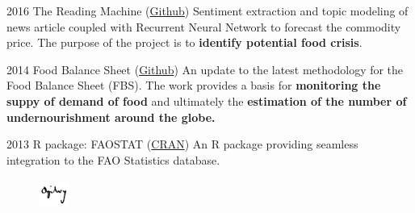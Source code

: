 \documentclass{tccv}
\begin{document}
\begin{yearlist}
\item{2016} {The Reading Machine
  (\href{https://github.com/EST-Team-Adam/TheReadingMachine}{Github})}
  {Sentiment extraction and topic modeling of news article coupled
    with Recurrent Neural Network to forecast the commodity price. The
    purpose of the project is to \textbf{identify potential food
      crisis}.}

  
\item{2014} {Food Balance Sheet
  (\href{https://github.com/SWS-Methodology}{Github})} {An update to
  the latest methodology for the Food Balance Sheet (FBS). The work
  provides a basis for \textbf{monitoring the suppy of demand of food}
  and ultimately the \textbf{estimation of the number of
    undernourishment around the globe.}}
  



\item{2013}
     {R package: FAOSTAT
       (\href{http://cran.r-project.org/web/packages/FAOSTAT/index.html}{CRAN})}
     {An R package providing seamless integration to the FAO
       Statistics database.}
  
\end{yearlist}


\begin{figure}[h!] %
  \centering
  \includegraphics[width=1cm,height=1cm]{../company_icon/ogilvy.jpg}
\end{figure}
\end{document}
